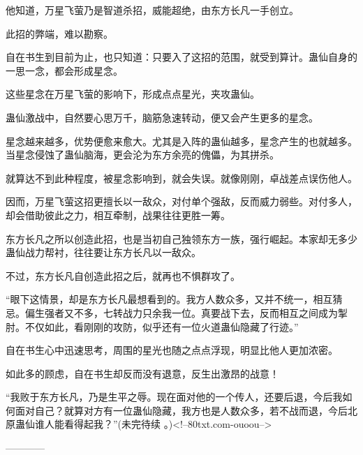 \begin{this_body}
他知道，万星飞萤乃是智道杀招，威能超绝，由东方长凡一手创立。

此招的弊端，难以勘察。

自在书生到目前为止，也只知道：只要入了这招的范围，就受到算计。蛊仙自身的一思一念，都会形成星念。

这些星念在万星飞萤的影响下，形成点点星光，夹攻蛊仙。

蛊仙激战中，自然要心思万千，脑筋急速转动，便又会产生更多的星念。

星念越来越多，优势便愈来愈大。尤其是入阵的蛊仙越多，星念产生的也就越多。当星念侵蚀了蛊仙脑海，更会沦为东方余亮的傀儡，为其拼杀。

就算达不到此种程度，被星念影响到，就会失误。就像刚刚，卓战差点误伤他人。

因而，万星飞萤这招更擅长以一敌众，对付单个强敌，反而威力弱些。对付多人，却会借助彼此之力，相互牵制，战果往往更胜一筹。

东方长凡之所以创造此招，也是当初自己独领东方一族，强行崛起。本家却无多少蛊仙战力帮衬，往往要让东方长凡以一敌众。

不过，东方长凡自创造此招之后，就再也不惧群攻了。

“眼下这情景，却是东方长凡最想看到的。我方人数众多，又并不统一，相互猜忌。偏生强者又不多，七转战力只余我一位。真要战下去，反而相互之间成为掣肘。不仅如此，看刚刚的攻防，似乎还有一位火道蛊仙隐藏了行迹。”

自在书生心中迅速思考，周围的星光也随之点点浮现，明显比他人更加浓密。

如此多的顾虑，自在书生却反而没有退意，反生出激昂的战意！

“我败于东方长凡，乃是生平之辱。现在面对他的一个传人，还要后退，今后我如何面对自己？就算对方有一位蛊仙隐藏，我方也是人数众多，若不战而退，今后北原蛊仙谁人能看得起我？”(未完待续 。)<!--80txt.com-ouoou-->

------------

\end{this_body}

